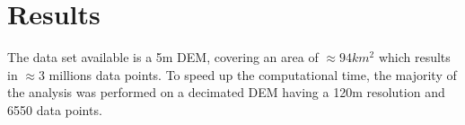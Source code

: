 \documentclass[12pt,letterpaper]{article}
\begin{document}

\section{Results}

The data set available is a 5m DEM, covering an area of $\approx 94 km^2$ which results in $\approx 3$ millions 
data points. To speed up the computational time, the majority of the analysis was performed on a decimated 
DEM having a 120m resolution and 6550 data points. 
\end{document}
